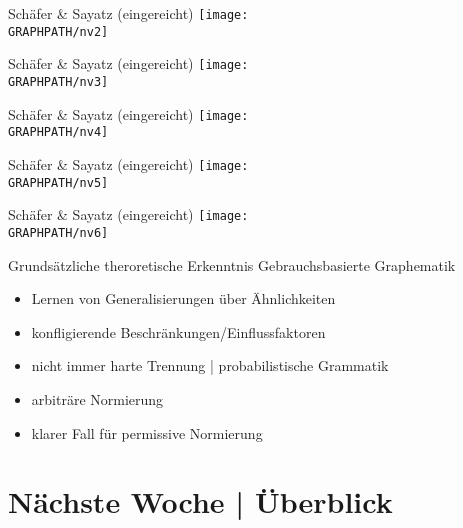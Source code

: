 \begin{frame}
  {Schäfer \& Sayatz (eingereicht)}
  \centering 
  \texttt{[image: \\GRAPHPATH/nv2]}
\end{frame}

\begin{frame}
  {Schäfer \& Sayatz (eingereicht)}
  \centering 
  \texttt{[image: \\GRAPHPATH/nv3]}
\end{frame}

\begin{frame}
  {Schäfer \& Sayatz (eingereicht)}
  \centering 
  \texttt{[image: \\GRAPHPATH/nv4]}
\end{frame}

\begin{frame}
  {Schäfer \& Sayatz (eingereicht)}
  \centering 
  \texttt{[image: \\GRAPHPATH/nv5]}
\end{frame}

\begin{frame}
  {Schäfer \& Sayatz (eingereicht)}
  \centering 
  \texttt{[image: \\GRAPHPATH/nv6]}
\end{frame}

\begin{frame}
  {Grundsätzliche theroretische Erkenntnis}
  Gebrauchsbasierte Graphematik\\
  \Zeile
  \begin{itemize}[<+->]
    \item Lernen von Generalisierungen über Ähnlichkeiten
    \item konfligierende Beschränkungen\slash Einflussfaktoren
    \item nicht immer harte Trennung | \alert{probabilistische Grammatik}
      \Zeile
    \item arbiträre Normierung
    \item klarer Fall für permissive Normierung
  \end{itemize}
\end{frame}


\ifdefined\TITLE
  \section{Nächste Woche | Überblick}

